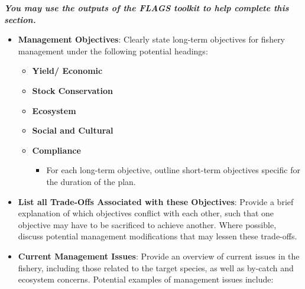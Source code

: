 \documentclass[]{book}
\providecommand{\tightlist}{%
  \setlength{\itemsep}{0pt}\setlength{\parskip}{0pt}}
\begin{document}
\textbf{\emph{You may use the outputs of the FLAGS toolkit to help
complete this section.}}

\begin{itemize}
\item
  \textbf{Management Objectives}: Clearly state long-term objectives for
  fishery management under the following potential headings:

  \begin{itemize}
  \item
    \textbf{Yield/ Economic}
  \item
    \textbf{Stock Conservation}
  \item
    \textbf{Ecosystem }
  \item
    \textbf{Social and Cultural}
  \item
    \textbf{Compliance}

    \begin{itemize}
    \tightlist
    \item
      For each long-term objective, outline short-term objectives
      specific for the duration of the plan.
    \end{itemize}
  \end{itemize}
\item
  \textbf{List all Trade-Offs Associated with these Objectives}: Provide
  a brief explanation of which objectives conflict with each other, such
  that one objective may have to be sacrificed to achieve another. Where
  possible, discuss potential management modifications that may lessen
  these trade-offs.
\item
  \textbf{Current Management Issues}: Provide an overview of current
  issues in the fishery, including those related to the target species,
  as well as by-catch and ecosystem concerns. Potential examples of
  management issues include:


\end{itemize}
\end{document}
